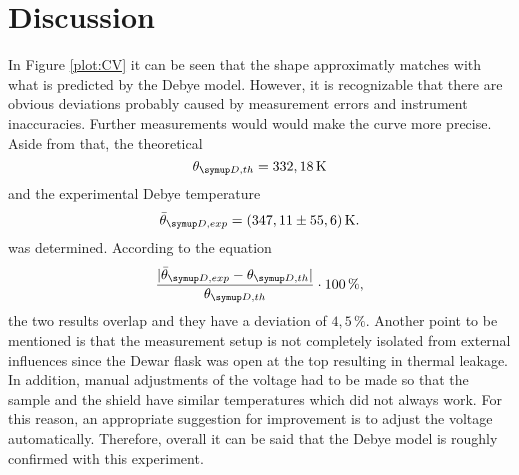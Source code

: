 
\section{Discussion}

In Figure \ref{plot:CV} it can be seen that the shape approximatly matches with 
what is predicted by the Debye model. However, it is recognizable that there are
obvious deviations probably caused by measurement errors and instrument inaccuracies.
Further measurements would would make the curve more precise.
Aside from that, the theoretical 
\begin{equation*}
    \theta\idx{D,th} = 332,18\,\unit{\kelvin}
\end{equation*}
and the experimental Debye temperature
\begin{equation*}
    \bar{\theta}\idx{D,exp} = (347,11 \pm 55,6)\,\unit{\kelvin}.
\end{equation*}
was determined. 
According to the equation 
\begin{equation*}
    \frac{|\bar{\theta}\idx{D,exp}-\theta\idx{D,th}|}{\theta\idx{D,th}} \cdot 100\,\unit{\percent},
\end{equation*}
the two results overlap and they have a deviation of $4,5\,\unit{\percent}$.
Another point to be mentioned is that the measurement setup is not completely isolated from external influences since
the Dewar flask was open at the top resulting in thermal leakage.
In addition, manual adjustments of the voltage had to be made so that the sample and the shield have similar temperatures
which did not always work. For this reason, an appropriate suggestion for improvement is to adjust the voltage automatically.
Therefore, overall it can be said that the Debye model is roughly confirmed with this experiment.